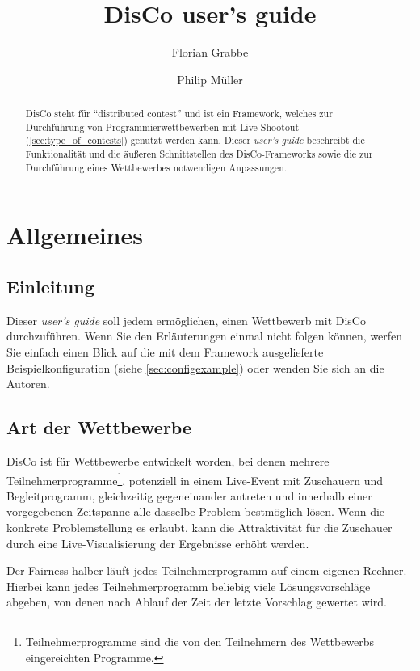 \documentclass[a4paper, 12pt]{article}
\title{DisCo user's guide}
\author{Florian Grabbe \and Philip Müller}
\begin{document}
\maketitle

\tableofcontents

\setlength{\tabcolsep}{8pt}        %
\renewcommand{\arraystretch}{1.2}  %

\begin{abstract}
  DisCo steht für ``distributed contest'' und ist ein Framework, welches zur
  Durchführung von Programmierwettbewerben mit Live-Shootout
  (\ref{sec:type_of_contests}) genutzt werden kann.
  Dieser \emph{user's guide} beschreibt die Funktionalität und die äußeren
  Schnittstellen des DisCo-Frameworks sowie die zur Durchführung eines
  Wettbewerbes notwendigen Anpassungen.
\end{abstract}


\section{Allgemeines}

\subsection{Einleitung}
Dieser \emph{user's guide} soll jedem ermöglichen, einen Wettbewerb mit DisCo
durchzuführen. Wenn Sie den Erläuterungen einmal nicht folgen können, werfen
Sie einfach einen Blick auf die mit dem Framework ausgelieferte
Beispielkonfiguration (siehe \ref{sec:configexample}) oder wenden Sie
sich an die Autoren.

\subsection{Art der Wettbewerbe}
\label{sec:type_of_contests}

DisCo ist für Wettbewerbe entwickelt worden, bei denen mehrere
Teilnehmerprogramme\footnote{Teilnehmerprogramme sind die von den
Teilnehmern des Wettbewerbs eingereichten Programme.}, potenziell in
einem Live-Event mit Zuschauern und Begleitprogramm, gleichzeitig gegeneinander
antreten und innerhalb einer vorgegebenen Zeitspanne alle dasselbe Problem
bestmöglich lösen. Wenn die konkrete Problemstellung es erlaubt, kann die
Attraktivität für die Zuschauer durch eine Live-Visualisierung der Ergebnisse
erhöht werden.

Der Fairness halber läuft jedes Teilnehmerprogramm auf einem eigenen Rechner.
Hierbei kann jedes Teilnehmerprogramm beliebig viele Lö\-sungs\-vor\-schlä\-ge
abgeben, von denen nach Ablauf der Zeit der letzte Vorschlag gewertet wird.
\end{document}
